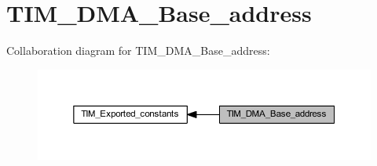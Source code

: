 \hypertarget{group___t_i_m___d_m_a___base__address}{}\section{T\+I\+M\+\_\+\+D\+M\+A\+\_\+\+Base\+\_\+address}
\label{group___t_i_m___d_m_a___base__address}
Collaboration diagram for T\+I\+M\+\_\+\+D\+M\+A\+\_\+\+Base\+\_\+address\+:
\nopagebreak
\begin{figure}[H]
\begin{center}
\leavevmode
\includegraphics[width=350pt]{group___t_i_m___d_m_a___base__address}
\end{center}
\end{figure}
